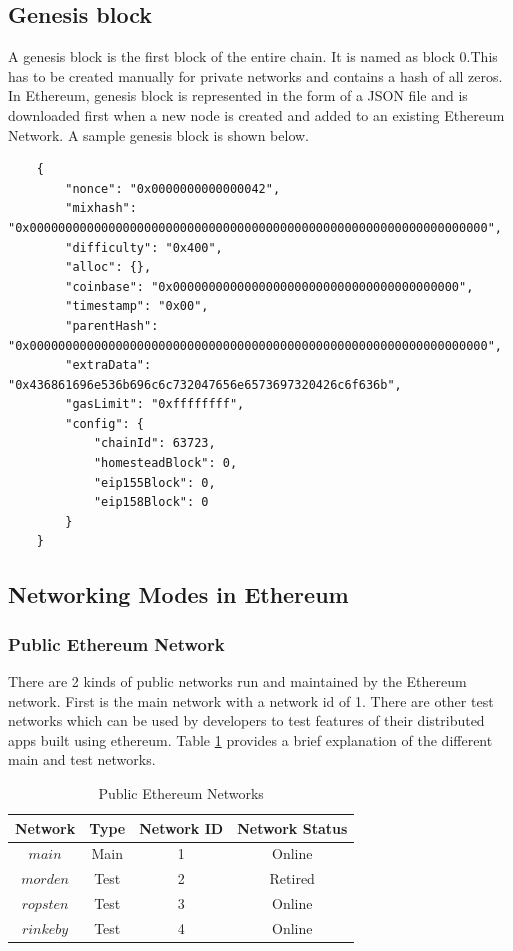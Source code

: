 \documentclass[11pt,openright]{report}
\begin{document}
\subsection{Genesis block}
A genesis block is the first block of the entire chain. It is named as block 0.This has to be created manually for private networks and contains a hash of all zeros. In Ethereum, genesis block is represented in the form of a JSON file and is downloaded first when a new node is created and added to an existing Ethereum Network. A sample genesis block is shown below.
\begin{verbatim}
    {
        "nonce": "0x0000000000000042",
        "mixhash": "0x0000000000000000000000000000000000000000000000000000000000000000",
        "difficulty": "0x400",
        "alloc": {}, 
        "coinbase": "0x0000000000000000000000000000000000000000",
        "timestamp": "0x00",
        "parentHash": "0x0000000000000000000000000000000000000000000000000000000000000000",
        "extraData": "0x436861696e536b696c6c732047656e6573697320426c6f636b",
        "gasLimit": "0xffffffff",
        "config": {
            "chainId": 63723,
            "homesteadBlock": 0,
            "eip155Block": 0,
            "eip158Block": 0
        }
    }
\end{verbatim}
\newpage

\subsection{Networking Modes in Ethereum}
\subsubsection{Public Ethereum Network}
There are 2 kinds of public networks run and maintained by the Ethereum network. 
First is the main network with a network id of 1. There are other test networks which can be used by developers to test features of their distributed apps built using ethereum. Table \ref{pub_eth_networks} provides a brief explanation of the different main and test networks. 

\begin{table}[!htbp]
	\renewcommand{\arraystretch}{1.3}
	\caption{Public Ethereum Networks}
	\label{pub_eth_networks}
	\centering
	\begin{tabular}{|c||c|c|c|}
		\hline
		\bfseries Network & \bfseries Type & \bfseries Network ID & \bfseries Network Status \\
		\hline\hline
		$main$ & Main & 1 & Online \\ \hline
		$morden$ & Test & 2 & Retired \\ \hline
		$ropsten$ & Test & 3 & Online \\ \hline
		$rinkeby$ & Test & 4 & Online \\ \hline

	\end{tabular}
\end{table}
\end{document}

